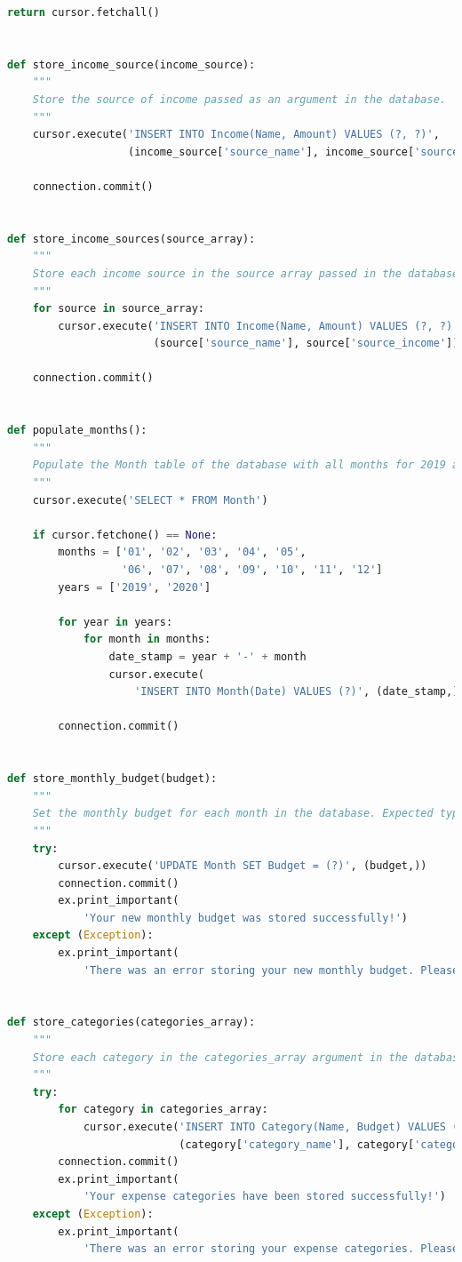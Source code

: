 \documentclass[11pt]{article}
\begin{document}
\begin{lstlisting}[language=Python, caption=Source code for \textit{expsql.py}.]
    return cursor.fetchall()


def store_income_source(income_source):
    """
    Store the source of income passed as an argument in the database.
    """
    cursor.execute('INSERT INTO Income(Name, Amount) VALUES (?, ?)',
                   (income_source['source_name'], income_source['source_income']))

    connection.commit()


def store_income_sources(source_array):
    """
    Store each income source in the source array passed in the database.
    """
    for source in source_array:
        cursor.execute('INSERT INTO Income(Name, Amount) VALUES (?, ?)',
                       (source['source_name'], source['source_income']))

    connection.commit()


def populate_months():
    """
    Populate the Month table of the database with all months for 2019 and 2020.
    """
    cursor.execute('SELECT * FROM Month')

    if cursor.fetchone() == None:
        months = ['01', '02', '03', '04', '05',
                  '06', '07', '08', '09', '10', '11', '12']
        years = ['2019', '2020']

        for year in years:
            for month in months:
                date_stamp = year + '-' + month
                cursor.execute(
                    'INSERT INTO Month(Date) VALUES (?)', (date_stamp,))

        connection.commit()


def store_monthly_budget(budget):
    """
    Set the monthly budget for each month in the database. Expected type is float.
    """
    try:
        cursor.execute('UPDATE Month SET Budget = (?)', (budget,))
        connection.commit()
        ex.print_important(
            'Your new monthly budget was stored successfully!')
    except (Exception):
        ex.print_important(
            'There was an error storing your new monthly budget. Please try again!')


def store_categories(categories_array):
    """
    Store each category in the categories_array argument in the database.
    """
    try:
        for category in categories_array:
            cursor.execute('INSERT INTO Category(Name, Budget) VALUES (?, ?)',
                           (category['category_name'], category['category_budget']))
        connection.commit()
        ex.print_important(
            'Your expense categories have been stored successfully!')
    except (Exception):
        ex.print_important(
            'There was an error storing your expense categories. Please try again!')



\end{lstlisting}
\end{document}
